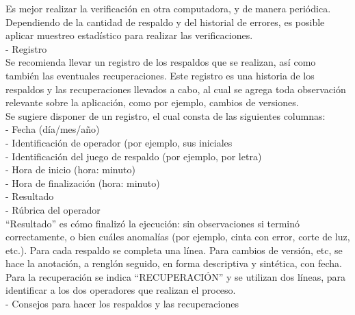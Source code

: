 \documentclass[12pt,letterpaper]{article}
\begin{document}
Es mejor realizar la verificación en otra computadora, y de manera periódica. Dependiendo de la cantidad de respaldo y del historial de errores, es posible aplicar muestreo estadístico para realizar las verificaciones. \\

-	Registro\\
 
Se recomienda llevar un registro de los respaldos que se realizan, así como también las eventuales recuperaciones. Este registro es una historia de los respaldos y las recuperaciones llevados a cabo, al cual se agrega toda observación relevante sobre la aplicación, como por ejemplo, cambios de versiones. \\
 
Se sugiere disponer de un registro, el cual consta de las siguientes columnas:\\ 
-	Fecha (día/mes/año)\\
-	Identificación de operador (por ejemplo, sus iniciales\\
-	Identificación del juego de respaldo (por ejemplo, por letra)\\ 
-	Hora de inicio (hora: minuto)\\
-	Hora de finalización (hora: minuto)\\
-	Resultado\\
-	Rúbrica del operador \\
“Resultado” es cómo finalizó la ejecución: sin observaciones si terminó correctamente, o bien cuáles anomalías (por ejemplo, cinta con error, corte de luz, etc.). Para cada respaldo se completa una línea. Para cambios de versión, etc, se hace la anotación, a renglón seguido, en forma descriptiva y sintética, con fecha. Para la recuperación se indica “RECUPERACIÓN” y se utilizan dos líneas, para identificar a los dos operadores que realizan el proceso.  \\

-	Consejos para hacer los respaldos y las recuperaciones \\
\end{document}
